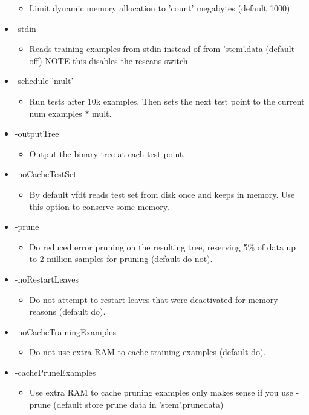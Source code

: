 \begin{itemize}
\begin{itemize}
\item Limit dynamic memory allocation to 'count' megabytes (default 1000)\end{itemize}
\item -stdin\begin{itemize}
\item Reads training examples from stdin instead of from 'stem'.data (default off) NOTE this disables the rescans switch\end{itemize}
\item -schedule 'mult'\begin{itemize}
\item Run tests after 10k examples. Then sets the next test point to the current num examples $\ast$ mult.\end{itemize}
\item -output\-Tree\begin{itemize}
\item Output the binary tree at each test point.\end{itemize}
\item -no\-Cache\-Test\-Set\begin{itemize}
\item By default vfdt reads test set from disk once and keeps in memory. Use this option to conserve some memory.\end{itemize}
\item -prune\begin{itemize}
\item Do reduced error pruning on the resulting tree, reserving 5\% of data up to 2 million samples for pruning (default do not).\end{itemize}
\item -no\-Restart\-Leaves\begin{itemize}
\item Do not attempt to restart leaves that were deactivated for memory reasons (default do).\end{itemize}
\item -no\-Cache\-Training\-Examples\begin{itemize}
\item Do not use extra RAM to cache training examples (default do).\end{itemize}
\item -cache\-Prune\-Examples\begin{itemize}
\item Use extra RAM to cache pruning examples only makes sense if you use -prune (default store prune data in 'stem'.prunedata)\end{itemize}

\end{itemize}
